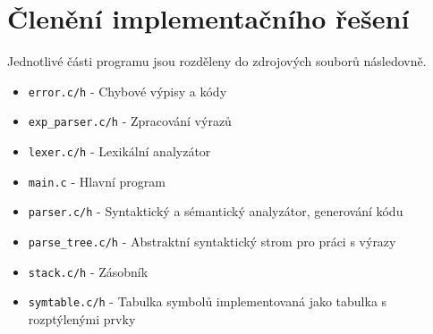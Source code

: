 \documentclass[11pt,a4paper]{article}
\begin{document}
\section{Členění implementačního řešení}
Jednotlivé části programu jsou rozděleny do zdrojových souborů následovně.
\begin{itemize}
	\item\texttt{error.c/h} - Chybové výpisy a kódy
	\item\texttt{exp\_parser.c/h} - Zpracování výrazů
	\item\texttt{lexer.c/h} - Lexikální analyzátor
	\item\texttt{main.c} - Hlavní program
	\item\texttt{parser.c/h} - Syntaktický a sémantický analyzátor, generování kódu
	\item\texttt{parse\_tree.c/h} - Abstraktní syntaktický strom pro práci s výrazy
	\item\texttt{stack.c/h} - Zásobník
	\item\texttt{symtable.c/h} - Tabulka symbolů implementovaná jako tabulka s rozptýlenými prvky
\end{itemize}
\end{document}

